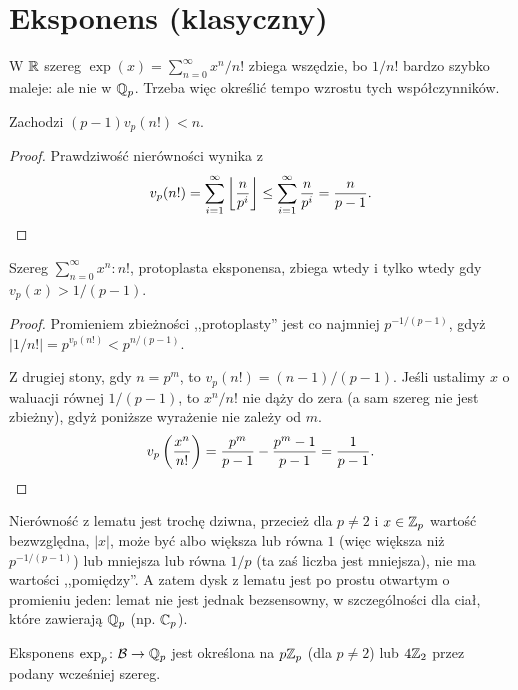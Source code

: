 \section{Eksponens (klasyczny)}
W $\mathbb R$ szereg $\exp(x) = \sum_{n = 0}^\infty x^n/n!$ zbiega wszędzie, bo $1/n!$ bardzo szybko maleje: ale nie w $\mathbb Q_p$.
Trzeba więc określić tempo wzrostu tych współczynników.

\begin{lemat}
	Zachodzi $(p-1) v_p(n!) < n$.
\end{lemat}

\begin{proof}
	Prawdziwość nierówności wynika z
	\[
		v_p(n!) = \sum_{i = 1}^\infty \left \lfloor \frac n {p^i} \right \rfloor \le \sum_{i = 1}^\infty \frac n {p^i} = \frac n {p-1}. \qedhere
	\]
\end{proof}

\begin{lemat}
	Szereg $\sum_{n = 0}^\infty {x^n}:{n!}$, protoplasta eksponensa, zbiega wtedy i tylko wtedy gdy $v_p(x) > 1 / (p-1)$. 
\end{lemat}

\begin{proof}
	Promieniem zbieżności ,,protoplasty'' jest co najmniej $p^{-1/(p-1)}$, gdyż $|1/n!| = p^{v_p(n!)} < p^{n/(p-1)}$.
	
	Z drugiej stony, gdy $n = p^m$, to $v_p(n!) = (n-1)/(p-1)$.
	Jeśli ustalimy $x$ o waluacji równej $1 / (p-1)$, to $x^n/n!$ nie dąży do zera (a sam szereg nie jest zbieżny), gdyż poniższe wyrażenie nie zależy od $m$.
	\[
		v_p\left ( \frac{x^n}{n!}\right) = \frac{p^m}{p-1} - \frac{p^m-1}{p-1} = \frac{1}{p-1}. \qedhere
	\]
\end{proof}

Nierówność z lematu jest trochę dziwna, przecież dla $p \neq 2$ i $x \in \mathbb Z_p$ wartość bezwzględna, $|x|$, może być albo większa lub równa $1$ (więc większa niż $p^{-1/(p-1)}$) lub mniejsza lub równa $1/p$ (ta zaś liczba jest mniejsza), nie ma wartości ,,pomiędzy''.
A zatem dysk z lematu jest po prostu otwartym o promieniu jeden: lemat nie jest jednak bezsensowny, w szczególności dla ciał, które zawierają $\mathbb Q_p$ (np. $\mathbb C_p$).

\begin{definicja}
	Eksponens $\exp_p \colon \mathcal B \to \mathbb Q_p$ jest określona na $p\mathbb Z_p$ (dla $p \neq 2$) lub $4\mathbb Z_2$ przez podany wcześniej szereg.
\end{definicja}

